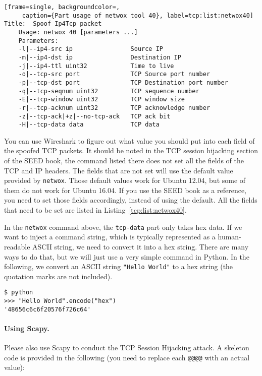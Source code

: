 \begin{lstlisting}[frame=single, backgroundcolor=,
     caption={Part usage of netwox tool 40}, label=tcp:list:netwox40]
Title:  Spoof Ip4Tcp packet   
    Usage: netwox 40 [parameters ...]
    Parameters:
    -l|--ip4-src ip                Source IP      
    -m|--ip4-dst ip                Destination IP    
    -j|--ip4-ttl uint32            Time to live 
    -o|--tcp-src port              TCP Source port number    
    -p|--tcp-dst port              TCP Destination port number    
    -q|--tcp-seqnum uint32         TCP sequence number
    -E|--tcp-window uint32         TCP window size
    -r|--tcp-acknum uint32         TCP acknowledge number 
    -z|--tcp-ack|+z|--no-tcp-ack   TCP ack bit
    -H|--tcp-data data             TCP data
\end{lstlisting}


You can use Wireshark to figure out what value you should put into each field of the 
spoofed TCP packets. It should be noted in the TCP session hijacking section of the 
SEED book, the command listed there does not set all the fields of the TCP and IP
headers. The fields that are not set will use the default value provided
by \texttt{netwox}. Those default 
values work for Ubuntu 12.04, but some of them do not work for Ubuntu 16.04. 
If you use the SEED book as a reference, you need to set those fields accordingly, instead 
of using the default. All the 
fields that need to be set are listed in Listing~\ref{tcp:list:netwox40}.


In the \texttt{netwox} command above, the \texttt{tcp-data} part only 
takes hex data. If we want to inject a command string, which is typically represented 
as a human-readable ASCII string, we need to convert it into  a hex string. 
There are many ways to do that, but we will just use a very simple command in Python. 
In the following, we convert an ASCII string \texttt{"Hello World"} to
a hex string (the quotation marks are not included).

\begin{lstlisting}
$ python
>>> "Hello World".encode("hex")
'48656c6c6f20576f726c64'
\end{lstlisting}


\paragraph{Using Scapy.} Please also use Scapy to conduct the TCP Session Hijacking attack.
A skeleton code is provided in the following (you need to replace each
\texttt{@@@@} with an actual value):


